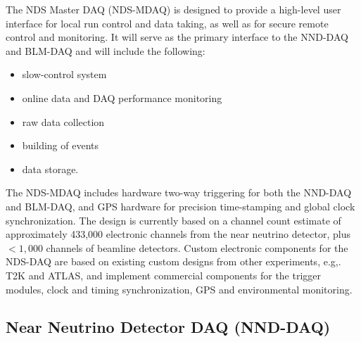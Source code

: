 The NDS Master DAQ (NDS-MDAQ) %
is designed to provide a high-level user interface 
for local run control and data taking, as well as for secure remote control and monitoring.   It will 
serve as the primary interface to the NND-DAQ and BLM-DAQ and will include the following:
\begin{itemize}
\item slow-control system 
\item online data and DAQ performance monitoring  
\item raw data collection
\item building of events
\item data storage.   
\end{itemize}
The NDS-MDAQ %
includes hardware two-way triggering 
for both the NND-DAQ and BLM-DAQ, and 
GPS hardware for precision 
time-stamping and global 
clock synchronization.  %
The design is currently based on a channel count 
estimate of approximately 433,000 electronic channels from the near neutrino
detector, plus $<1,000$ channels of 
beamline detectors.  Custom electronic components for the NDS-DAQ are based on existing 
custom designs from other experiments, e.g,. T2K and ATLAS, 
and %
implement commercial components for the trigger modules, clock and timing synchronization, 
GPS and environmental monitoring.



\subsection{Near Neutrino Detector DAQ (NND-DAQ)} %
\label{sec:nd:nnd:daq}

